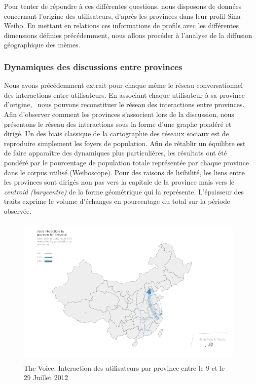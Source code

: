 Pour tenter de r\'epondre \`a ces diff\'erentes questions, nous
disposons de donn\'ees concernant l{\textquoteright}origine des
utilisateurs, d{\textquoteright}apr\`es les provinces dans leur profil
Sina Weibo. En mettant en relations ces informations de profils avec
les diff\'erentes dimensions d\'efinies pr\'ec\'edemment, nous allons
proc\'eder \`a l{\textquoteright}analyse de la diffusion g\'eographique
des m\`emes.

\subsubsection{ Dynamiques des discussions entre provinces}
Nous avons pr\'ec\'edemment extrait pour chaque m\^eme le r\'eseau
conversationnel des interactions entre utilisateurs. En associant
chaque utilisateur \`a sa province d{\textquoteright}origine, \ nous
pouvons reconstituer le r\'eseau des interactions entre provinces. Afin
d{\textquoteright}observer comment les provinces
s{\textquoteright}associent lors de la discussion, nous pr\'esentons le
r\'eseau des interactions sous la forme d{\textquoteright}une graphe
pond\'er\'e et dirig\'e. Un des biais classique de la cartographie des
r\'eseaux sociaux est de reproduire simplement les foyers de
population. Afin de r\'etablir un \'equilibre est de faire appara\^itre
des dynamiques plus particuli\`eres, les r\'esultats ont \'et\'e
pond\'er\'e par le pourcentage de population totale repr\'esent\'ee par
chaque province dans le corpus utilis\'e (Weiboscope). Pour des raisons
de lisibilit\'e, les liens entre les provinces sont dirig\'es non pas
vers la capitale de la province mais vers le \textit{centroid
(barycentre) }de la forme g\'eom\'etrique qui la repr\'esente.
L{\textquoteright}\'epaisseur des traits exprime le volume
d{\textquoteright}\'echanges en pourcentage du total sur la p\'eriode
observ\'ee.

\begin{figure}[H]
    \centering
    \includegraphics[width=4.6606in,height=2.913in]{figures/chap4/chapitre4-img19.png}
    \caption{
      The Voice: Interaction des utilisateurs par province entre le 9 et le 29 Juillet 2012
    }
    \label{fig:geo-voice-t1}
\end{figure}

